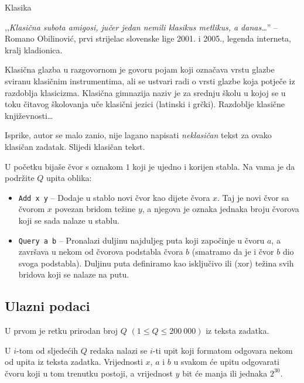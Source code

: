 \begin{statement}[
  problempoints=110,
  timelimit=1 sekunda,
  memorylimit=512 MiB,
]{Klasika}


,,\textit{Klasična subota amigosi, jučer jedan nemili klasikus metlikus, a danas\dots}''
-- Romano Obilinović, prvi strijelac slovenske lige 2001. i 2005.,
legenda interneta, kralj kladionica.

Klasična glazba u razgovornom je govoru pojam koji označava vrstu glazbe
sviranu klasičnim instrumentima, ali se ustvari radi o vrsti glazbe koja
potječe iz razdoblja klasicizma. Klasična gimnazija naziv je za srednju školu
u kojoj se u toku čitavog školovanja uče klasični jezici (latinski i grčki).
Razdoblje klasične književnosti\dots

Isprike, autor se malo zanio, nije lagano napisati \textit{neklasičan} tekst
za ovako klasičan zadatak. Slijedi klasičan tekst.

U početku bijaše čvor s oznakom $1$ koji je ujedno i korijen stabla. Na vama je
da podržite $Q$ upita oblika:
\begin{itemize}
  \item \texttt{Add x y} -- Dodaje u stablo novi čvor kao dijete čvora $x$. Taj
        je novi čvor sa čvorom $x$ povezan bridom težine $y$, a njegova je oznaka
        jednaka broju čvorova koji se sada nalaze u stablu.
  \item \texttt{Query a b} -- Pronalazi duljinu najduljeg puta koji započinje u
    čvoru $a$, a završava u nekom od čvorova podstabla čvora $b$ (smatramo da je i
    čvor $b$ dio svoga podstabla). Duljinu puta definiramo kao isključivo ili
    (xor) težina svih bridova koji se nalaze na putu.
\end{itemize}

\subsection*{Ulazni podaci}
U prvom je retku prirodan broj $Q$ $(1 \le Q \le 200\ 000)$ iz teksta zadatka.

U $i$-tom od sljedećih $Q$ redaka nalazi se $i$-ti upit koji formatom odgovara
nekom od upita iz teksta zadatka. Vrijednosti $x$, $a$ i $b$ u svakom će
upitu odgovarati čvoru koji u tom trenutku postoji, a vrijednost $y$ bit će
manja ili jednaka $2^{30}$.


\end{statement}
